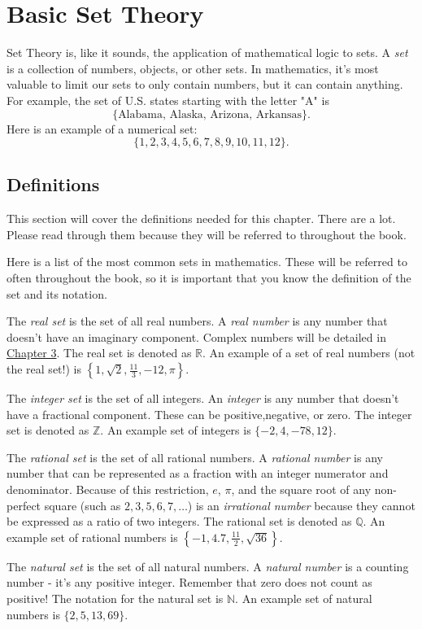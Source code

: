 \documentclass[lang=en,11pt]{elegantbook}
\begin{document}
\section{Basic Set Theory}
\noindent Set Theory is, like it sounds, the application of mathematical logic to sets.  A \textit{set} is a collection of numbers, objects, or other sets.  In mathematics, it's most valuable to limit our sets to only contain numbers, but it can contain anything.  For example, the set of U.S.  states starting with the letter "A" is $$\{\text{Alabama, Alaska, Arizona, Arkansas}\}.$$
Here is an example of a numerical set: $$\{1,2,3,4,5,6,7,8,9,10,11,12\}.$$
\subsection{Definitions}
This section will cover the definitions needed for this chapter.  There are a lot.  Please read through them because they will be referred to throughout the book.  

Here is a list of the most common sets in mathematics.  These will be referred to often throughout the book, so it is important that you know the definition of the set and its notation.

The \textit{real set} is the set of all real numbers.  A \textit{real number} is any number that doesn't have an imaginary component.  Complex numbers will be detailed in \hyperlink{chapter.3}{Chapter 3}.  The real set is denoted as $\mathbb{R}$.  An example of a set of real numbers (not the real set!) is $\displaystyle \left\{1,\sqrt{2},\frac{11}{3},-12,\pi\right\}$.

The \textit{integer set} is the set of all integers.  An \textit{integer} is any number that doesn't have a fractional component.  These can be positive,negative, or zero.  The integer set is denoted as $\mathbb{Z}$.  An example set of integers is $\{-2,4,-78,12\}$.

The \textit{rational set} is the set of all rational numbers.  A \textit{rational number} is any number that can be represented as a fraction with an integer numerator and denominator.  Because of this restriction, $e$, $\pi$, and the square root of any non-perfect square (such as $2,3,5,6,7,\ldots$) is an \textit{irrational number} because they cannot be expressed as a ratio of two integers.  The rational set is denoted as $\mathbb{Q}$.  An example set of rational numbers is $\displaystyle \left\{-1,4.7,\frac{11}{2},\sqrt{36}\right\}$.

The \textit{natural set} is the set of all natural numbers.  A \textit{natural number} is a counting number - it's any positive integer.  Remember that zero does not count as positive! The notation for the natural set is $\mathbb{N}$.  An example set of natural numbers is $\{2,5,13,69\}$.
\end{document}
